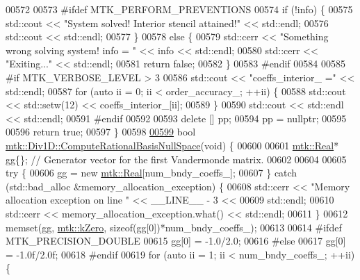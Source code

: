 \begin{DoxyCode}
{{00572 
00573 \textcolor{preprocessor}{  #ifdef MTK\_PERFORM\_PREVENTIONS}
00574   \textcolor{keywordflow}{if} (!info) \{
00575     std::cout << \textcolor{stringliteral}{"System solved! Interior stencil attained!"} << std::endl;
00576     std::cout << std::endl;
00577   \}
00578   \textcolor{keywordflow}{else} \{
00579     std::cerr << \textcolor{stringliteral}{"Something wrong solving system! info = "} << info << std::endl;
00580     std::cerr << \textcolor{stringliteral}{"Exiting..."} << std::endl;
00581     \textcolor{keywordflow}{return} \textcolor{keyword}{false};
00582   \}
00583 \textcolor{preprocessor}{  #endif}
00584 
00585 \textcolor{preprocessor}{  #if MTK\_VERBOSE\_LEVEL > 3}
00586   std::cout << \textcolor{stringliteral}{"coeffs\_interior\_ ="} << std::endl;
00587   \textcolor{keywordflow}{for} (\textcolor{keyword}{auto} ii = 0; ii < order\_accuracy\_; ++ii) \{
00588     std::cout << std::setw(12) << coeffs\_interior\_[ii];
00589   \}
00590   std::cout << std::endl << std::endl;
00591 \textcolor{preprocessor}{  #endif}
00592 
00593   \textcolor{keyword}{delete} [] pp;
00594   pp = \textcolor{keyword}{nullptr};
00595 
00596   \textcolor{keywordflow}{return} \textcolor{keyword}{true};
00597 \}
00598 
\hypertarget{mtk__div__1d_8cc_source_l00599}{}\hyperlink{classmtk_1_1Div1D_aa0c0c278b2c00a29c1ceaa70d31aebab}{00599} \textcolor{keywordtype}{bool} \hyperlink{classmtk_1_1Div1D_aa0c0c278b2c00a29c1ceaa70d31aebab}{mtk::Div1D::ComputeRationalBasisNullSpace}(\textcolor{keywordtype}{void}) \{
00600 
00601   \hyperlink{group__c01-roots_gac080bbbf5cbb5502c9f00405f894857d}{mtk::Real}* gg\{\}; \textcolor{comment}{// Generator vector for the first Vandermonde matrix.}
00602 
00604 
00605   \textcolor{keywordflow}{try} \{
00606     gg = \textcolor{keyword}{new} \hyperlink{group__c01-roots_gac080bbbf5cbb5502c9f00405f894857d}{mtk::Real}[num\_bndy\_coeffs\_];
00607   \} \textcolor{keywordflow}{catch} (std::bad\_alloc &memory\_allocation\_exception) \{
00608     std::cerr << \textcolor{stringliteral}{"Memory allocation exception on line "} << \_\_LINE\_\_ - 3 <<
00609       std::endl;
00610     std::cerr << memory\_allocation\_exception.what() << std::endl;
00611   \}
00612   memset(gg, \hyperlink{group__c01-roots_ga59a451a5fae30d59649bcda274fea271}{mtk::kZero}, \textcolor{keyword}{sizeof}(gg[0])*num\_bndy\_coeffs\_);
00613 
00614 \textcolor{preprocessor}{  #ifdef MTK\_PRECISION\_DOUBLE}
00615   gg[0] = -1.0/2.0;
00616 \textcolor{preprocessor}{  #else}
00617   gg[0] = -1.0f/2.0f;
00618 \textcolor{preprocessor}{  #endif}
00619   \textcolor{keywordflow}{for} (\textcolor{keyword}{auto} ii = 1; ii < num\_bndy\_coeffs\_; ++ii) \{
}}
\end{DoxyCode}
